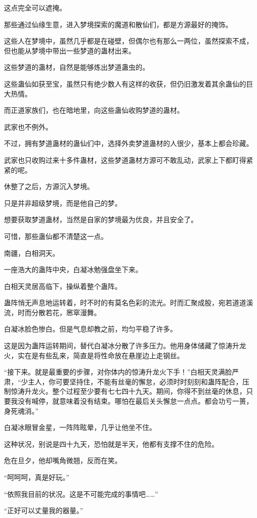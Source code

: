 \begin{this_body}
这点完全可以遮掩。

那些通过仙缘生意，进入梦境探索的魔道和散仙们，都是方源最好的掩饰。

这些人在梦境中，虽然几乎都是在碰壁，但偶尔也有那么一两位，虽然探索不成，但也能从梦境中带出一些梦道的蛊材出来。

这些梦道的蛊材，自然是能够炼出梦道蛊虫的。

这些蛊仙如获至宝，虽然只有绝少数人有这样的收获，但仍旧激发着其余蛊仙的巨大热情。

而正道家族们，也在暗地里，向这些蛊仙收购梦道的蛊材。

武家也不例外。

不过，拥有梦道蛊材的蛊仙们中，选择外卖梦道蛊材的人很少，基本上都会珍藏。

武家也只收购过来十多件蛊材，这些梦道蛊材方源可不敢乱动，武家上下都盯得紧紧的呢。

休整了之后，方源沉入梦境。

只是并非超级梦境，而是他自己的梦。

想要获取梦道蛊材，当然是自家的梦境最为优良，并且安全了。

可惜，那些蛊仙都不清楚这一点。

南疆，白相洞天。

一座浩大的蛊阵中央，白凝冰勉强盘坐下来。

白相天灵居高临下，操纵着整个蛊阵。

蛊阵悄无声息地运转着，时不时的有莫名色彩的流光。时而汇聚成股，宛若道道溪流，时而分散若花，窸窣漫舞。

白凝冰脸色惨白。但是气息却教之前，均匀平稳了许多。

这是因为蛊阵运转期间，替代白凝冰分散了许多压力。他用身体储藏了惊涛升龙火，实在是有些乱来，简直是将性命放在悬崖边上走钢丝。

“接下来。就是最重要的步骤，对你体内的惊涛升龙火下手！”白相天灵满脸严肃，“少主人，你可要坚持住，不能有丝毫的懈怠，必须时时刻刻和蛊阵配合，压制惊涛升龙火。整个过程至少要有七七四十九天。期间，你得不到丝毫的休息，只要我没有喊停，就意味着没有结束。哪怕在最后关头懈怠一点点。都会功亏一篑，身死魂消。”

白凝冰眼冒金星，一阵阵眩晕，几乎让他坐不住。

这种状况，别说是四十九天，恐怕就是半天，他都有支撑不住的危险。

危在旦夕，他却嘴角微翘，反而在笑。

“呵呵呵，真是好玩。”

“依照我目前的状况。这是不可能完成的事情吧……”

“正好可以丈量我的器量。”


\end{this_body}
